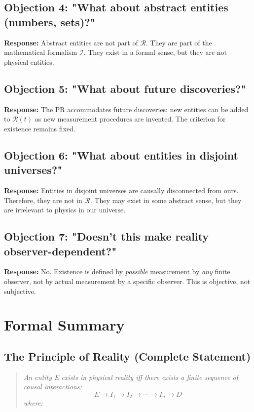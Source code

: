 \documentclass[aps,preprint,showpacs,showkeys]{revtex4}%
\begin{document}
\subsection{Objection 4: "What about abstract entities (numbers, sets)?"}

\textbf{Response:} Abstract entities are not part of $\mathcal{R}$. They are
part of the mathematical formalism $\mathcal{I}$. They exist in a formal
sense, but they are not physical entities.

\subsection{Objection 5: "What about future discoveries?"}

\textbf{Response:} The PR accommodates future discoveries: new entities can
be added to $\mathcal{R}(t)$ as new measurement procedures are invented. The
criterion for existence remains fixed.

\subsection{Objection 6: "What about entities in disjoint universes?"}

\textbf{Response:} Entities in disjoint universes are causally disconnected
from ours. Therefore, they are not in $\mathcal{R}$. They may exist in some
abstract sense, but they are irrelevant to physics in our universe.

\subsection{Objection 7: "Doesn't this make reality observer-dependent?"}

\textbf{Response:} No. Existence is defined by \emph{possible} measurement
by \emph{any} finite observer, not by actual measurement by a specific
observer. This is objective, not subjective.

\section{Formal Summary}

\subsection{The Principle of Reality (Complete Statement)}

\begin{quote}
\emph{An entity E exists in physical reality iff there exists a finite
sequence of causal interactions:} 
\begin{equation}
E \rightarrow I_1 \rightarrow I_2 \rightarrow \cdots \rightarrow I_n
\rightarrow D
\end{equation}
\emph{where:}
\end{quote}
\end{document}
